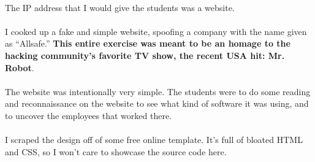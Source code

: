 \documentclass[11pt]{article}
\begin{document}
	\paragraph{} The IP address that I would give the students was a website.

	\paragraph{} I cooked up a fake and simple website, spoofing a company with the name given as ``Allsafe.'' \textbf{This entire exercise was meant to be an homage to the hacking community's favorite TV show, the recent USA hit: Mr. Robot}.

	\paragraph{}

	\begin{center}
		\graphicspath{ {.} }
		\centering
	\end{center}	

	\paragraph{}	

	\paragraph{} The website was intentionally very simple. The students were to do some reading and reconnaissance on the website to see what kind of software it was using, and to uncover the employees that worked there.

	\paragraph{} I scraped the design off of some free online template. It's full of bloated HTML and CSS, so I won't care to showcase the source code here.

	\newpage
\end{document}
